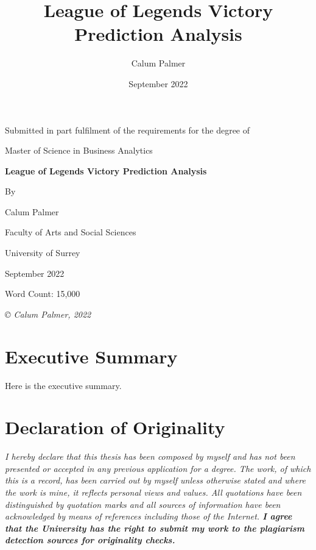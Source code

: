 \documentclass[12pt,a4 paper]{report}
\title{League of Legends Victory Prediction Analysis}
\author{Calum Palmer}
\date{September 2022}
\begin{document}
    \begin{titlepage}
    \centering
        {\large Submitted in part fulfilment of the requirements for the degree of}


        {\Large Master of Science in Business Analytics}

    \vspace{2cm}
        {\huge\bfseries League of Legends Victory Prediction Analysis}

    \vspace{1.5cm}
        {By}

    \vspace{0.5cm}
        {\Large Calum Palmer}

    \vspace{5cm}
        {\large Faculty of Arts and Social Sciences}

    \vspace{0.25cm}
        {\large University of Surrey}

    \vspace{1cm}
        {\large September 2022}

    \vspace{1.5cm}
        {\large Word Count: 15,000}

    \vfill
        {\itshape © Calum Palmer, 2022}

    \end{titlepage}

    \setcounter{page}{2}

    \section*{Executive Summary}\label{sec:executive summary}
    Here is the executive summary.

    \newpage

    \section*{Declaration of Originality}\label{sec:declaration of originality}

    \emph{I hereby declare that this thesis has been composed by myself and has not been
    presented or accepted in any previous application for a degree. The work, of which
    this is a record, has been carried out by myself unless otherwise stated and where
    the work is mine, it reflects personal views and values. All quotations have been
    distinguished by quotation marks and all sources of information have been
    acknowledged by means of references including those of the Internet.
    \textbf{I agree that the University has the right to submit my work to the plagiarism
    detection sources for originality checks.}}
\end{document}
